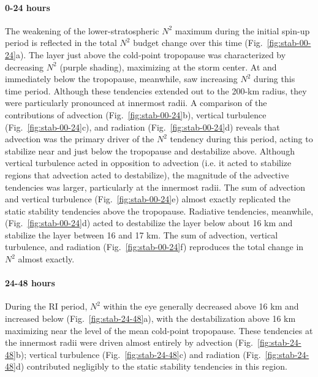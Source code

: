 \documentclass{ametsoc}
\begin{document}
\paragraph{0-24 hours}
The weakening of the lower-stratospheric $N^2$ maximum during the initial spin-up period is reflected in the total $N^2$ budget change over this time (Fig.~\ref{fig:stab-00-24}a).
The layer just above the cold-point tropopause was characterized by decreasing $N^2$ (purple shading), maximizing at the storm center.
At and immediately below the tropopause, meanwhile, saw increasing $N^2$ during this time period.
Although these tendencies extended out to the 200-km radius, they were particularly pronounced at innermost radii.
A comparison of the contributions of advection (Fig.~\ref{fig:stab-00-24}b), vertical turbulence (Fig.~\ref{fig:stab-00-24}c), and radiation (Fig.~\ref{fig:stab-00-24}d) reveals that advection was the primary driver of the $N^2$ tendency during this period, acting to stabilize near and just below the tropopause and destabilize above.
Although vertical turbulence acted in opposition to advection (i.e. it acted to stabilize regions that advection acted to destabilize), the magnitude of the advective tendencies was larger, particularly at the innermost radii.
The sum of advection and vertical turbulence (Fig.~\ref{fig:stab-00-24}e) almost exactly replicated the static stability tendencies above the tropopause.
Radiative tendencies, meanwhile, (Fig.~\ref{fig:stab-00-24}d) acted to destabilize the layer below about 16 km and stabilize the layer between 16 and 17 km.
The sum of advection, vertical turbulence, and radiation (Fig.~\ref{fig:stab-00-24}f) reproduces the total change in $N^2$ almost exactly.

\paragraph{24-48 hours}
During the RI period, $N^2$ within the eye generally decreased above 16 km and increased below (Fig.~\ref{fig:stab-24-48}a), with the destabilization above 16 km maximizing near the level of the mean cold-point tropopause.
These tendencies at the innermost radii were driven almost entirely by advection (Fig.~\ref{fig:stab-24-48}b); vertical turbulence (Fig.~\ref{fig:stab-24-48}c) and radiation (Fig.~\ref{fig:stab-24-48}d) contributed negligibly to the static stability tendencies in this region.
\end{document}
